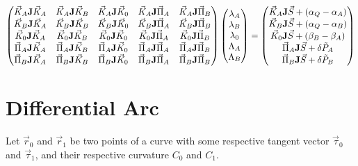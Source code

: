 \documentclass[11pt]{amsart}
\newcommand{\mymat}[1]{\mathbf{#1}}
\begin{document}
\[
	\begin{pmatrix}
		\vec{K}_A\mymat{J}\vec{K}_A&\vec{K}_A\mymat{J}\vec{K}_B&\vec{K}_A\mymat{J}\vec{K}_0&\vec{K}_A\mymat{J}\vec{\Pi}_A&\vec{K}_A\mymat{J}\vec{\Pi}_B\cr
		\vec{K}_B\mymat{J}\vec{K}_A&\vec{K}_B\mymat{J}\vec{K}_B&\vec{K}_B\mymat{J}\vec{K}_0&\vec{K}_B\mymat{J}\vec{\Pi}_A&\vec{K}_B\mymat{J}\vec{\Pi}_B\cr
		\vec{K}_0\mymat{J}\vec{K}_A&\vec{K}_0\mymat{J}\vec{K}_B&\vec{K}_0\mymat{J}\vec{K}_0&\vec{K}_0\mymat{J}\vec{\Pi}_A&\vec{K}_0\mymat{J}\vec{\Pi}_B\cr
		\vec{\Pi}_A\mymat{J}\vec{K}_A&\vec{\Pi}_A\mymat{J}\vec{K}_B&\vec{\Pi}_A\mymat{J}\vec{K}_0&\vec{\Pi}_A\mymat{J}\vec{\Pi}_A&\vec{\Pi}_A\mymat{J}\vec{\Pi}_B\cr
		\vec{\Pi}_B\mymat{J}\vec{K}_A&\vec{\Pi}_B\mymat{J}\vec{K}_B&\vec{\Pi}_B\mymat{J}\vec{K}_0&\vec{\Pi}_B\mymat{J}\vec{\Pi}_A&\vec{\Pi}_B\mymat{J}\vec{\Pi}_B\cr
	\end{pmatrix}
	\begin{pmatrix}
	\lambda_A\cr
	\lambda_B\cr
	\lambda_0\cr
	\Lambda_A\cr
	\Lambda_B\cr
	\end{pmatrix}
	=
	\begin{pmatrix}
		\vec{K}_A\mymat{J}\vec{S} + (\alpha_Q-\alpha_A)\cr
		\vec{K}_B\mymat{J}\vec{S} + (\alpha_Q-\alpha_B)\cr
	 	\vec{K}_0\mymat{J}\vec{S} + (\beta_B-\beta_A)\cr
	 	\vec{\Pi}_A\mymat{J}\vec{S} + \delta\tilde{P}_A\cr
	 	\vec{\Pi}_B\mymat{J}\vec{S}+ \delta\tilde{P}_B\cr
	\end{pmatrix}
\]
\section{Differential Arc}
Let $\vec{r}_0$ and $\vec{r}_1$ be two points of a curve
with some respective tangent vector $\vec{\tau}_0$ and $\vec{\tau}_1$, and their
respective curvature $C_0$ and $C_1$.
\end{document}
